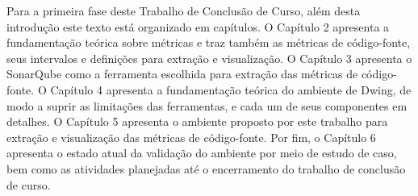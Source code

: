 Para a primeira fase deste Trabalho de Conclusão de Curso, além desta introdução
este texto está organizado em capítulos. O Capítulo 2 apresenta a fundamentação teórica
sobre métricas e traz também as métricas de código-fonte, seus intervalos e definições para extração e visualização. O Capítulo 3 apresenta o SonarQube como a ferramenta escolhida para extração das métricas de código-fonte.
O Capítulo 4 apresenta a fundamentação teórica do ambiente de Dwing, de modo a suprir as limitações das ferramentas, e cada um de seus componentes em detalhes. 
O Capítulo 5 apresenta o ambiente proposto por este trabalho para extração e visualização das métricas de código-fonte. Por fim, o Capítulo 6 apresenta o estado atual da validação 
do ambiente por meio de estudo de caso, bem como as atividades planejadas até o encerramento do trabalho de conclusão de curso.
%

